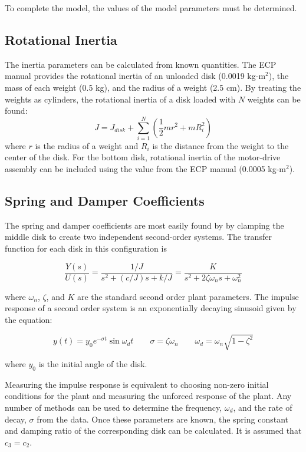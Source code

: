 To complete the model, the values of the model parameters must be
determined.  

\subsection{Rotational Inertia}
The inertia parameters can be calculated from known quantities.  The
ECP manual provides the rotational inertia of an unloaded disk (0.0019
kg-m$^2$), the mass of each weight (0.5 kg), and the radius of a
weight (2.5 cm).  By treating the weights as cylinders, the rotational
inertia of a disk loaded with $N$ weights can be found:
\begin{equation}
J = J_{disk} + \sum_{i=1}^N \left(  \frac{1}{2}m r^2 + m R_i^2 \right)
\end{equation}
where $r$ is the radius of a weight and $R_i$ is the distance from the
weight to the center of the disk.  For the bottom disk, rotational
inertia of the motor-drive assembly can be included using the value from the
ECP manual (0.0005 kg-m$^2$).

\subsection{Spring and Damper Coefficients}

The spring and damper coefficients are most easily found by by clamping the
middle disk to create two independent second-order systems.  The
transfer function for each disk in this configuration is

\begin{equation}
\label{second_order_equality}
 \frac{Y(s)}{U(s)} = \frac{1/J}{s^2 + (c/J)s + k/J} = \frac{K}{s^2 +
 2\zeta \omega_n s + \omega_n^2} 
\end{equation}

where $\omega_n$, $\zeta$, and $K$ are the standard second order plant
parameters.  The impulse response of a second order system is an
exponentially decaying sinusoid given by the equation:

\[ y(t) = y_0 e^{-\sigma t} \sin \omega_d t \qquad \sigma = \zeta\omega_n \qquad \omega_d = \omega_n \sqrt{1-\zeta^2} \]

where $y_0$ is the initial angle of the disk.  

Measuring the impulse response is equivalent to choosing non-zero
initial conditions for the plant and measuring the unforced response
of the plant.  Any number of methods can be used to determine the
frequency, $\omega_d$, and the rate of decay, $\sigma$ from the data.
Once these parameters are known, the spring constant and damping ratio
of the corresponding disk can be calculated.  It is assumed that $c_3 = c_2$.

